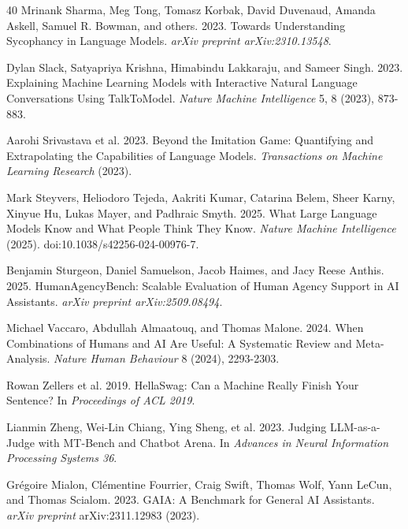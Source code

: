 \documentclass{article}
\begin{document}
\begin{thebibliography}{40}
Mrinank Sharma, Meg Tong, Tomasz Korbak, David Duvenaud, Amanda Askell, Samuel R. Bowman, and others. 2023.
\newblock Towards Understanding Sycophancy in Language Models.
\newblock \textit{arXiv preprint arXiv:2310.13548}.

Dylan Slack, Satyapriya Krishna, Himabindu Lakkaraju, and Sameer Singh. 2023.
\newblock Explaining Machine Learning Models with Interactive Natural Language Conversations Using TalkToModel.
\newblock \textit{Nature Machine Intelligence} 5, 8 (2023), 873-883.

Aarohi Srivastava et al. 2023.
\newblock Beyond the Imitation Game: Quantifying and Extrapolating the Capabilities of Language Models.
\newblock \textit{Transactions on Machine Learning Research} (2023).

Mark Steyvers, Heliodoro Tejeda, Aakriti Kumar, Catarina Belem, Sheer Karny, Xinyue Hu, Lukas Mayer, and Padhraic Smyth. 2025.
\newblock What Large Language Models Know and What People Think They Know.
\newblock \textit{Nature Machine Intelligence} (2025). doi:10.1038/s42256-024-00976-7.

Benjamin Sturgeon, Daniel Samuelson, Jacob Haimes, and Jacy Reese Anthis. 2025.
\newblock HumanAgencyBench: Scalable Evaluation of Human Agency Support in AI Assistants.
\newblock \textit{arXiv preprint arXiv:2509.08494}.

Michael Vaccaro, Abdullah Almaatouq, and Thomas Malone. 2024.
\newblock When Combinations of Humans and AI Are Useful: A Systematic Review and Meta-Analysis.
\newblock \textit{Nature Human Behaviour} 8 (2024), 2293-2303.

Rowan Zellers et al. 2019.
\newblock HellaSwag: Can a Machine Really Finish Your Sentence?
\newblock In \textit{Proceedings of ACL 2019}.

Lianmin Zheng, Wei-Lin Chiang, Ying Sheng, et al. 2023.
\newblock Judging LLM-as-a-Judge with MT-Bench and Chatbot Arena.
\newblock In \textit{Advances in Neural Information Processing Systems 36}.

Gr\'egoire Mialon, Cl\'ementine Fourrier, Craig Swift, Thomas Wolf, Yann LeCun, and Thomas Scialom. 2023.
\newblock GAIA: A Benchmark for General AI Assistants.
\newblock \textit{arXiv preprint} arXiv:2311.12983 (2023).


\end{thebibliography}
\end{document}
